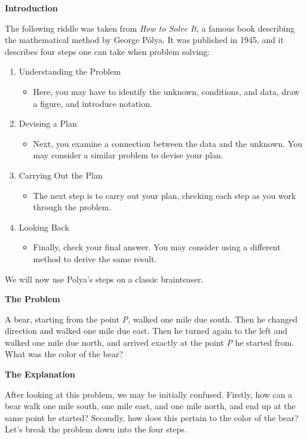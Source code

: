 \noindent
\textbf{Introduction}

The following riddle was taken from \emph{How to Solve It}, a famous book describing the mathematical method by George Pólya. It was published in 1945, and it describes four steps one can take when problem solving:

\begin{enumerate}
   \item Understanding the Problem
   \begin{itemize}
     \item Here, you may have to identify the unknown, conditions, and data, draw a figure, and introduce notation.
   \end{itemize}
   \item Devising a Plan
   \begin{itemize}
     \item Next, you examine a connection between the data and the unknown. You may consider a similar problem to devise your plan.
   \end{itemize}
   \item Carrying Out the Plan
   \begin{itemize}
     \item The next step is to carry out your plan, checking each step as you work through the problem.
   \end{itemize}
   \item Looking Back
   \begin{itemize}
     \item Finally, check your final answer. You may consider using a different method to derive the same result.
   \end{itemize}
\end{enumerate}

\noindent
We will now use Polya’s steps on a classic brainteaser.

\noindent
\textbf{The Problem}

A bear, starting from the point \emph{P}, walked one mile due south. Then he changed direction and walked one mile due east. Then he turned again to the left and walked one mile due north, and arrived exactly at the point \emph{P} he started from. What was the color of the bear?

\noindent
\textbf{The Explanation}

After looking at this problem, we may be initially confused. Firstly, how can a bear walk one mile south, one mile east, and one mile north, and end up at the same point he started? Secondly, how does this pertain to the color of the bear? Let’s break the problem down into the four steps.

